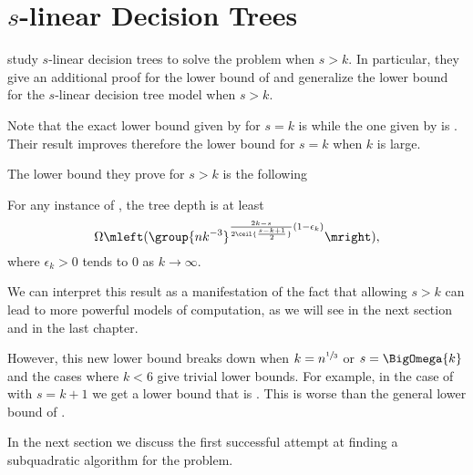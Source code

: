 \section{$s$-linear Decision Trees}

\citet*{ailon:2005} study $s$-linear decision trees to solve the \kSUM
problem when $s > k$. In particular, they give an additional proof for the
 lower bound of \citet{erickson:1999} and
generalize the lower bound for the \(s\)-linear decision tree model when $s > k$.

Note that the exact lower bound given by \citet*{erickson:1999} for \(s = k\) is
 while the one given by
\citet*{ailon:2005} is . Their result
improves therefore the lower bound for \(s = k\) when \(k\) is large.

The lower bound they prove for \(s > k\) is the following
\begin{theorem}
For any instance of \kLDT, the tree depth is at least
\begin{displaymath}
\Omega\mleft(\group{nk^{-3}}^{\frac{2k-s}{2\ceil{\frac{s-k+1}{2}}}
(1-\epsilon_k) }\mright),
\end{displaymath}
where \(\epsilon_k > 0\) tends to \(0\) as \(k \to\infty\).
\end{theorem}

We can interpret this result as a manifestation of the fact that allowing \(s >
k\) can lead to more powerful models of computation, as we will see in the next
section and in the last chapter.

However, this new lower bound breaks down when
\(k = n^{\sfrac{1}{3}}\) or \(s = \BigOmega{k}\) and the cases where \(k < 6\)
give trivial lower bounds. For example, in the case
of \threeSUM with \(s = k + 1\) we get a lower bound that is . This is
worse than the general lower bound of .

In the next section we discuss the first successful attempt at finding
a subquadratic algorithm for the \threeSUM problem.
